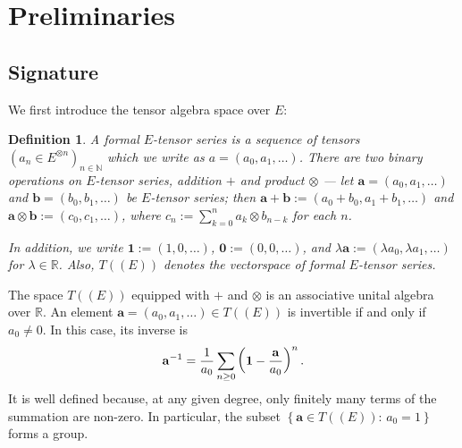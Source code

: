 \documentclass[11pt,a4paper,english,reqno]{amsart}
\theoremstyle{plain}
\newtheorem{definition}{Definition}[section]
\newcommand{\R}{\mathbb{R}}
\newcommand{\1}{\mathbbm{1}}
\begin{document}
\section{Preliminaries}\label{sec: prelim}

\subsection{Signature} We first introduce the tensor algebra space over $E$:
\begin{definition}
A formal $E$-tensor series is a sequence of tensors $\left( a_{n}\in
E^{\otimes n}\right) _{n\in \mathbb{N}}$ which we write as $a=\left(
a_{0},a_{1},\ldots \right) $. There are two binary operations on $E$-tensor series, addition $+$ and product $\otimes$ --- let $\mathbf{a}=(a_{0},a_{1},\ldots)$ and $\mathbf{b}%
=(b_{0},b_{1},\ldots)$ be $E$-tensor series; then $
\mathbf{a}+\mathbf{b}:=(a_{0}+b_{0},a_{1}+b_{1},\ldots)$ and $\mathbf{a}\otimes \mathbf{b}:=(c_{0},c_{1},\ldots)$, where $c_{n}:=\sum_{k=0}^{n}a_{k}\otimes b_{n-k}$ for each $n$.


In addition, we write $\mathbf{1}:=(1,0,\ldots)$, $\mathbf{0}:=(0,0,\ldots)$, and $\lambda \mathbf{a}:=(\lambda a_{0},\lambda a_{1},\ldots)$ for $\lambda \in \mathbb{R}$. Also, $T\left( \left( E\right) \right)$ denotes the vectorspace of formal $E$-tensor series.
\end{definition}


The space $T\left( \left( E\right) \right) $ equipped with $+$ and $\otimes $ is an associative unital algebra over $\mathbb{R}
$. An element  $\mathbf{a}=(a_{0},a_{1},\ldots) \in T\left( \left( E\right)
\right) $ is invertible if and only if $a_{0}\neq 0$. In this case, its inverse is 
\begin{equation*}
\mathbf{a}^{-1}=\frac{1}{a_{0}}\sum_{n\geq 0}\left(\mathbf{1}-\frac{\mathbf{a}}{%
a_{0}}\right)^{n}.
\end{equation*}%
It is well defined because, at any given degree, only finitely many terms of the summation are non-zero. In particular, the
subset $\left\{\mathbf{a}\in T\left( \left( E\right) \right) :\,a_{0}=1\right\}$ forms a group.
\end{document}
